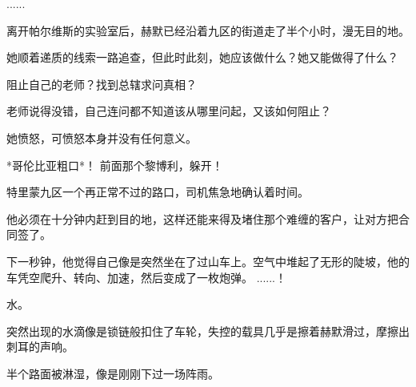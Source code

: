 \documentclass[openany]{book}
\begin{document}
\begin{dialogue}
     ......
\end{dialogue}
\par
离开帕尔维斯的实验室后，赫默已经沿着九区的街道走了半个小时，漫无目的地。\par
她顺着递质的线索一路追查，但此时此刻，她应该做什么？她又能做得了什么？\par
阻止自己的老师？找到总辖求问真相？\par
老师说得没错，自己连问都不知道该从哪里问起，又该如何阻止？\par
她愤怒，可愤怒本身并没有任何意义。

\begin{dialogue}
     *哥伦比亚粗口*！
     前面那个黎博利，躲开！\par
    特里蒙九区一个再正常不过的路口，司机焦急地确认着时间。\par
    他必须在十分钟内赶到目的地，这样还能来得及堵住那个难缠的客户，让对方把合同签了。\par
    下一秒钟，他觉得自己像是突然坐在了过山车上。空气中堆起了无形的陡坡，他的车凭空爬升、转向、加速，然后变成了一枚炮弹。
     ......！
\end{dialogue}

水。\par
突然出现的水滴像是锁链般扣住了车轮，失控的载具几乎是擦着赫默滑过，摩擦出刺耳的声响。\par
半个路面被淋湿，像是刚刚下过一场阵雨。
\end{document}
